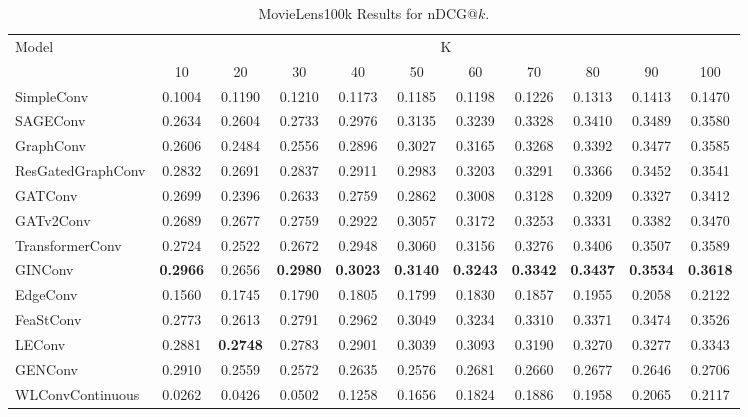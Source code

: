 \documentclass[bst/sn-nature]{sn-jnl}
\begin{document}
\begin{appendices}
\begin{table}[htbp]
    \centering 
    \begin{tabular}{|l|*{10}{c|}}
    \hline
    \multirow{2}{*}{Model} & \multicolumn{10}{c|}{K} \\
    \hhline{~*{10}{|-}|}
                             & 10    & 20    & 30    & 40    & 50    & 60    & 70    & 80    & 90    & 100   \\ \hline
    \rowcolor[gray]{0.9} SimpleConv               & 0.1004 & 0.1190 & 0.1210 & 0.1173 & 0.1185 & 0.1198 & 0.1226 & 0.1313 & 0.1413 & 0.1470 \\ 
    SAGEConv                 & 0.2634 & 0.2604 & 0.2733 & 0.2976 & 0.3135 & 0.3239 & 0.3328 & 0.3410 & 0.3489 & 0.3580 \\ 
    \rowcolor[gray]{0.9} GraphConv                & 0.2606 & 0.2484 & 0.2556 & 0.2896 & 0.3027 & 0.3165 & 0.3268 & 0.3392 & 0.3477 & 0.3585 \\ 
    ResGatedGraphConv        & 0.2832 & 0.2691 & 0.2837 & 0.2911 & 0.2983 & 0.3203 & 0.3291 & 0.3366 & 0.3452 & 0.3541 \\ 
    \rowcolor[gray]{0.9} GATConv                  & 0.2699 & 0.2396 & 0.2633 & 0.2759 & 0.2862 & 0.3008 & 0.3128 & 0.3209 & 0.3327 & 0.3412 \\ 
    GATv2Conv                & 0.2689 & 0.2677 & 0.2759 & 0.2922 & 0.3057 & 0.3172 & 0.3253 & 0.3331 & 0.3382 & 0.3470 \\ 
    \rowcolor[gray]{0.9} TransformerConv          & 0.2724 & 0.2522 & 0.2672 & 0.2948 & 0.3060 & 0.3156 & 0.3276 & 0.3406 & 0.3507 & 0.3589 \\ 
    GINConv                  & \textbf{0.2966} & 0.2656 & \textbf{0.2980} & \textbf{0.3023} & \textbf{0.3140} & \textbf{0.3243} & \textbf{0.3342} & \textbf{0.3437} & \textbf{0.3534} & \textbf{0.3618} \\ 
    \rowcolor[gray]{0.9} EdgeConv                 & 0.1560 & 0.1745 & 0.1790 & 0.1805 & 0.1799 & 0.1830 & 0.1857 & 0.1955 & 0.2058 & 0.2122 \\ 
    FeaStConv                & 0.2773 & 0.2613 & 0.2791 & 0.2962 & 0.3049 & 0.3234 & 0.3310 & 0.3371 & 0.3474 & 0.3526 \\ 
    \rowcolor[gray]{0.9} LEConv                   & 0.2881 & \textbf{0.2748} & 0.2783 & 0.2901 & 0.3039 & 0.3093 & 0.3190 & 0.3270 & 0.3277 & 0.3343 \\ 
    GENConv                  & 0.2910 & 0.2559 & 0.2572 & 0.2635 & 0.2576 & 0.2681 & 0.2660 & 0.2677 & 0.2646 & 0.2706 \\ 
    \rowcolor[gray]{0.9} WLConvContinuous         & 0.0262 & 0.0426 & 0.0502 & 0.1258 & 0.1656 & 0.1824 & 0.1886 & 0.1958 & 0.2065 & 0.2117 \\ \hline
    \end{tabular}
    \caption{MovieLens100k Results for nDCG@$k$.}
    \label{tab:ndcg}
\end{table}


\end{appendices}
\end{document}
